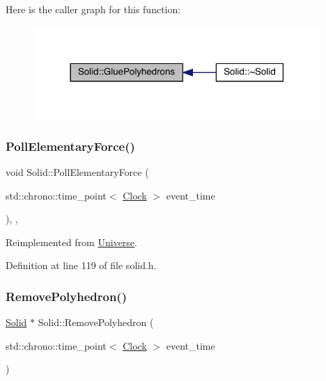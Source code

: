 Here is the caller graph for this function\+:
\nopagebreak
\begin{figure}[H]
\begin{center}
\leavevmode
\includegraphics[width=309pt]{class_solid_a94bb5df6d873c14a94355fc95557efd6_icgraph}
\end{center}
\end{figure}
\mbox{\label{class_solid_ae2a486e59f11f96a1a39756b3f3da53f}} 
\subsubsection{\texorpdfstring{Poll\+Elementary\+Force()}{PollElementaryForce()}}
{\footnotesize\ttfamily void Solid\+::\+Poll\+Elementary\+Force (\begin{DoxyParamCaption}\item[{std\+::chrono\+::time\+\_\+point$<$ \hyperlink{universe_8h_a0ef8d951d1ca5ab3cfaf7ab4c7a6fd80}{Clock} $>$}]{event\+\_\+time }\end{DoxyParamCaption})\hspace{0.3cm}{\ttfamily [inline]}, {\ttfamily [final]}, {\ttfamily [virtual]}}



Reimplemented from \hyperlink{class_universe_a0c485c504542409cbb5cfd8543c35b11}{Universe}.



Definition at line 119 of file solid.\+h.

\mbox{\label{class_solid_a1233a3fe43abca7d2a0f83d724fd6640}} 
\subsubsection{\texorpdfstring{Remove\+Polyhedron()}{RemovePolyhedron()}}
{\footnotesize\ttfamily \hyperlink{class_solid}{Solid} $\ast$ Solid\+::\+Remove\+Polyhedron (\begin{DoxyParamCaption}\item[{std\+::chrono\+::time\+\_\+point$<$ \hyperlink{universe_8h_a0ef8d951d1ca5ab3cfaf7ab4c7a6fd80}{Clock} $>$}]{event\+\_\+time }\end{DoxyParamCaption})}



